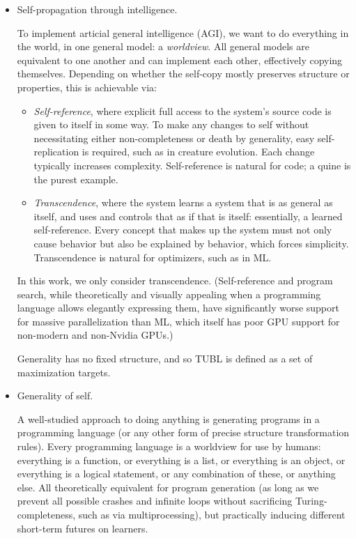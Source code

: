\documentclass{article}
\begin{document}
\begin{itemize}
\item Self-propagation through intelligence.

To implement articial general intelligence (AGI), we want to do everything in the world, in one general model: a \textit{worldview}. All general models are equivalent to one another and can implement each other, effectively copying themselves. Depending on whether the self-copy mostly preserves structure or properties, this is achievable via:

\begin{itemize}
\item \textit{Self-reference}, where explicit full access to the system's source code is given to itself in some way. To make any changes to self without necessitating either non-completeness or death by generality, easy self-replication is required, such as in creature evolution. Each change typically increases complexity. Self-reference is natural for code; a quine is the purest example.
\item \textit{Transcendence}, where the system learns a system that is as general as itself, and uses and controls that as if that is itself: essentially, a learned self-reference. Every concept that makes up the system must not only cause behavior but also be explained by behavior, which forces simplicity. Transcendence is natural for optimizers, such as in ML.
\end{itemize}

In this work, we only consider transcendence. (Self-reference and program search, while theoretically and visually appealing when a programming language allows elegantly expressing them, have significantly worse support for massive parallelization than ML, which itself has poor GPU support for non-modern and non-Nvidia GPUs.)

Generality has no fixed structure, and so TUBL is defined as a set of maximization targets.

\item Generality of self.

A well-studied approach to doing anything is generating programs in a programming language (or any other form of precise structure transformation rules). Every programming language is a worldview for use by humans: everything is a function, or everything is a list, or everything is an object, or everything is a logical statement, or any combination of these, or anything else. All theoretically equivalent for program generation (as long as we prevent all possible crashes and infinite loops without sacrificing Turing-completeness, such as via multiprocessing), but practically inducing different short-term futures on learners.


\end{itemize}
\end{document}
